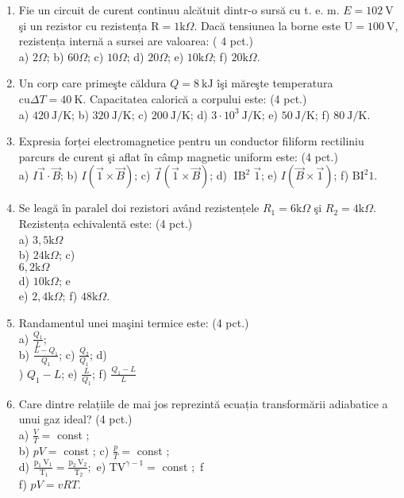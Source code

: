 \begin{enumerate}
  \item Fie un circuit de curent continuu alcătuit dintr-o sursă cu t. e. m. $E=102 \mathrm{~V}$ şi un rezistor cu rezistența $\mathrm{R}=1 \mathrm{k} \Omega$. Dacă tensiunea la borne este $\mathrm{U}=100 \mathrm{~V}$, rezistența internă a sursei are valoarea: ( 4 pct.)\\
a) $2 \Omega$; b) $60 \Omega$; c) $10 \Omega$; d) $20 \Omega$; e) $10 \mathrm{k} \Omega$; f) $20 \mathrm{k} \Omega$.
  \item Un corp care primeşte căldura $Q=8 \mathrm{~kJ}$ îşi măreşte temperatura $\mathrm{cu} \Delta T=40 \mathrm{~K}$. Capacitatea calorică a corpului este: (4 pct.)\\
a) $420 \mathrm{~J} / \mathrm{K}$; b) $320 \mathrm{~J} / \mathrm{K}$; c) $200 \mathrm{~J} / \mathrm{K}$; d) $3 \cdot 10^{3} \mathrm{~J} / \mathrm{K}$; e) $50 \mathrm{~J} / \mathrm{K}$; f) $80 \mathrm{~J} / \mathrm{K}$.
  \item Expresia forței electromagnetice pentru un conductor filiform rectiliniu parcurs de curent şi aflat în câmp magnetic uniform este: (4 pct.)\\
a) $I \overrightarrow{1} \cdot \vec{B}$; b) $I(\overrightarrow{1} \times \vec{B})$; c) $\vec{I}(\overrightarrow{1} \times \vec{B})$; d) $\operatorname{IB}^{2} \overrightarrow{1}$; e) $I(\vec{B} \times \overrightarrow{1})$; f) $\mathrm{BI}^{2} 1$.
  \item Se leagă în paralel doi rezistori având rezistențele $R_{1}=6 \mathrm{k} \Omega$ şi $R_{2}=4 \mathrm{k} \Omega$. Rezistența echivalentă este: (4 pct.)\\
a) $3,5 \mathrm{k} \Omega$\\
b) $24 \mathrm{k} \Omega$; c)\\
$6,2 \mathrm{k} \Omega$\\
d) $10 \mathrm{k} \Omega$; e\\
e) $2,4 \mathrm{k} \Omega$; f) $48 \mathrm{k} \Omega$.
  \item Randamentul unei maşini termice este: (4 pct.)\\
a) $\frac{Q_{1}}{L}$;\\
b) $\frac{L-Q_{1}}{Q_{1}}$; c) $\frac{Q_{2}}{Q_{1}}$; d)\\
) $Q_{1}-L$; e) $\frac{L}{Q_{1}}$; f) $\frac{Q_{1}-L}{L}$
  \item Care dintre relațiile de mai jos reprezintă ecuația transformării adiabatice a unui gaz ideal? (4 pct.)\\
a) $\frac{V}{T}=$ const ;\\
b) $p V=$ const ; c) $\frac{p}{T}=$ const ;\\
d) $\frac{\mathrm{p}_{1} \mathrm{~V}_{1}}{\mathrm{~T}_{1}}=\frac{\mathrm{p}_{2} \mathrm{~V}_{2}}{\mathrm{~T}_{2}} ;$ e) $\mathrm{TV}^{\gamma-1}=$ const $;$ f\\
f) $p V=v R T$.
\end{enumerate}

